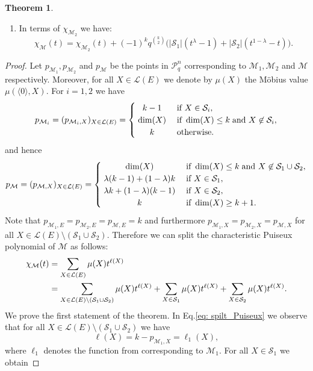 \documentclass[a4paper,11pt,reqno]{amsart}
\theoremstyle{definition}
\newtheorem{theorem}{Theorem}[section]
\newcommand{\mM}{\mathcal{M}}
\newcommand{\mL}{\mathcal{L}}
\newcommand{\mS}{\mathcal{S}}
\newcommand{\RP}{\mathcal{P}_q^n}
\begin{document}
{\begin{theorem}
\begin{enumerate}
        \item In terms of $\chi_{\mM_2}$ we have:
        \[
            \chi_{\mM}(t)=\chi_{\mM_2}(t)+(-1)^kq^{k\choose 2}\Big(|\mS_1|(t^\lambda-1)+|\mS_2|(t^{1-\lambda}-t)\Big).
        \]
    \end{enumerate}
\end{theorem}
\begin{proof}
    Let $p_{\mM_1},p_{\mM_2}$ and $p_\mM$ be the points in $\RP$ corresponding to $\mM_1,\mM_2$ and $\mM$ respectively. Moreover, for all $X\in\mL(E)$ we denote by $\mu(X)$ the Möbius value $\mu(\langle 0\rangle,X)$. 
    For $i=1,2$ we have
    \[
       p_{\mM_i}=(p_{\mM_i,X})_{X\in\mL(E)}=
       \begin{cases}
        \;\hfil k-1\;&\text{if }X\in\mS_i,\\
        \;\hfil \dim(X)\;&\text{if }\dim(X)\leq k\; \textnormal{and } X\not\in\mS_i,\\
        \;\hfil k\;&\text{otherwise}. 
        \end{cases} 
    \]
    and hence
    \[
        p_{\mM}=(p_{\mM,X})_{X\in\mL(E)}=
       \begin{cases}
        \;\hfil \dim(X)\;&\text{if }\dim(X)\leq k\; \textnormal{and } X\not\in\mS_1\cup\mS_2,\\
        \;\hfil \lambda(k-1)+(1-\lambda)k\;&\text{if } X\in\mS_1,\\
        \;\hfil \lambda k+(1-\lambda)(k-1)\;&\text{if } X\in\mS_2,\\
        \;\hfil k\;&\text{if } \dim(X)\geq k+1. 
        \end{cases}
    \]
    Note that $p_{\mM_1,E}=p_{\mM_2,E}=p_{\mM,E}=k$ and furthermore $p_{\mM_1,X}=p_{\mM_2,X}=p_{\mM,X}$ for all $X\in\mL(E)\setminus(\mS_1\cup\mS_2)$. Therefore we can split the characteristic Puiseux polynomial of $\mM$ as follows:
    \begin{align}
        \chi_\mM(t)&=\sum_{X\in\mL(E)}\mu(X)t^{\ell(X)}\notag \\
                   &= \sum_{X\in\mL(E)\setminus(\mS_1\cup\mS_2)}\mu(X)t^{\ell(X)}+\sum_{X\in\mS_1}\mu(X)t^{\ell(X)}+\sum_{X\in\mS_2}\mu(X)t^{\ell(X)}.\label{eq: spilt_Puiseux}
    \end{align}
     We prove the first statement of the theorem. In Eq.\eqref{eq: spilt_Puiseux} we observe that for all $X\in\mL(E)\setminus(\mS_1\cup\mS_2)$ we have
    \[
        \ell(X)=k-p_{\mM_1,X}=\ell_1(X),
    \]
    where $\ell_1$ denotes the function from  corresponding to $\mM_1$. For all $X\in\mS_1$ we obtain

\end{proof}}
\end{document}
